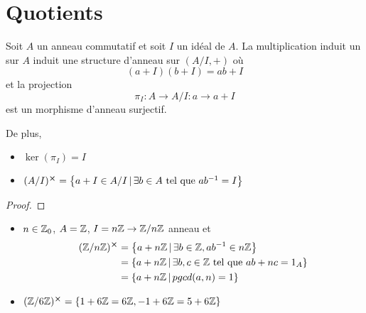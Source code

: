 \section{Quotients}

\begin{proposition}
	Soit $A$ un anneau commutatif et soit $I$ un idéal de $A$.
	La multiplication induit un sur $A$ induit une structure d'anneau sur $(A/I,
	+)$ où
	\begin{equation}
		(a + I) (b + I) = ab + I
	\end{equation}
	et la projection
	\begin{equation}
		\pi_{I} : A \rightarrow A / I : a \rightarrow a + I
	\end{equation}
	est un morphisme d'anneau surjectif.

	De plus,
	\begin{itemize}
		\item $\ker(\pi_{I}) = I$
		\item $(A / I)^{\cross} = \left\{a + I \in A / I \, | \, \exists b \in A
				\text{ tel que } ab^{-1} = I \right\}$
	\end{itemize}
\end{proposition}

\ifdefined\outputproof
\begin{proof}

\end{proof}
\fi

\begin{exemple}
	\begin{itemize}
		\item $n \in \mathbb{Z}_{0}$, $A = \mathbb{Z}$, $I = n \mathbb{Z} \rightarrow
			\mathbb{Z} / n \mathbb{Z}$ anneau et
			\begin{align}
				(\mathbb{Z} / n \mathbb{Z})^{\cross} &= \left\{a +
				n\mathbb{Z} \, | \, \exists b \in \mathbb{Z}, ab^{-1} \in n\mathbb{Z} \right\} \\
				& = \left\{a + n \mathbb{Z} \, | \, \exists b, c \in \mathbb{Z} \text{
				tel que } a b + n c = 1_{A} \right\} \\
				& = \left\{a + n \mathbb{Z} \, | \, pgcd(a, n) = 1 \right\}
			\end{align}
		\item $(\mathbb{Z} / 6 \mathbb{Z})^{\cross} = \left\{ 1 + 6\mathbb{Z} = 6\mathbb{Z}, -1 +
			6\mathbb{Z} = 5 + 6 \mathbb{Z} \right\}$
	\end{itemize}
\end{exemple}

